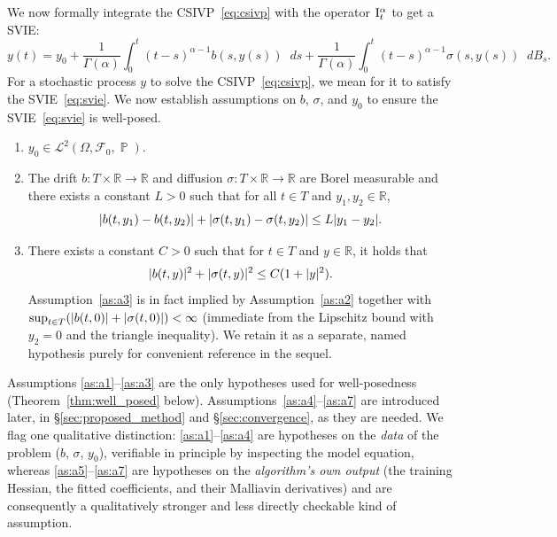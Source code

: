 \documentclass[11pt, a4paper]{article}
\theoremstyle{theoremstyle}
\theoremstyle{definitionstyle}
\newcommand{\dd}{\mathop{}\!d}
\DeclareMathOperator{\PP}{\mathbb P}
\DeclarePairedDelimiter{\abs}{\lvert}{\rvert}
\begin{document}
We now formally integrate the CSIVP~\eqref{eq:csivp} with the operator $\II$ to get a SVIE:
\begin{equation}\label{eq:svie}
    y(t) = y_0 + \frac 1{\Gamma(\alpha)}\int_0^t (t - s)^{\alpha - 1}b(s, y(s))\dd{s} + \frac 1{\Gamma(\alpha)}\int_0^t (t - s)^{\alpha - 1}\sigma(s, y(s))\dd{B_s}.
\end{equation}
For a stochastic process $y$ to solve the CSIVP~\eqref{eq:csivp}, we mean for it to satisfy the SVIE~\eqref{eq:svie}. We now establish assumptions on $b$, $\sigma$, and $y_0$ to ensure the SVIE~\eqref{eq:svie} is well-posed.
\begin{enumerate}[series=assumptions,label=(A\arabic*)]
    \item \label{as:a1} $y_0 \in \mathcal L^2(\Omega, \mathcal F_0, \PP)$.
    \item \label{as:a2} The drift $b : T \times \mathbb R \to \mathbb R$ and diffusion $\sigma : T \times \mathbb R \to \mathbb R$ are Borel measurable and there exists a constant $L > 0$ such that for all $t \in T$ and $y_1, y_2 \in \mathbb R$,
    \begin{equation}
        \abs{b(t, y_1) - b(t, y_2)} + \abs{\sigma(t, y_1) - \sigma(t, y_2)} \leq L\abs{y_1 - y_2}.
    \end{equation}
    \item \label{as:a3} There exists a constant $C > 0$ such that for $t \in T$ and $y \in \mathbb R$, it holds that
    \begin{equation}
        \abs{b(t, y)}^2 + \abs{\sigma(t, y)}^2 \leq C(1 + \abs{y}^2).
    \end{equation}
    Assumption~\ref{as:a3} is in fact implied by Assumption~\ref{as:a2} together with $\sup_{t\in T}(\abs{b(t,0)}+\abs{\sigma(t,0)})<\infty$ (immediate from the Lipschitz bound with $y_2=0$ and the triangle inequality). We retain it as a separate, named hypothesis purely for convenient reference in the sequel.
\end{enumerate}
Assumptions \ref{as:a1}--\ref{as:a3} are the only hypotheses used for well-posedness (Theorem~\ref{thm:well_posed} below). Assumptions~\ref{as:a4}--\ref{as:a7} are introduced later, in \S\ref{sec:proposed_method} and \S\ref{sec:convergence}, as they are needed. We flag one qualitative distinction: \ref{as:a1}--\ref{as:a4} are hypotheses on the \emph{data} of the problem ($b$, $\sigma$, $y_0$), verifiable in principle by inspecting the model equation, whereas \ref{as:a5}--\ref{as:a7} are hypotheses on the \emph{algorithm's own output} (the training Hessian, the fitted coefficients, and their Malliavin derivatives) and are consequently a qualitatively stronger and less directly checkable kind of assumption.
\end{document}
